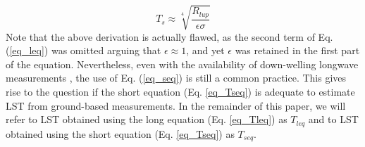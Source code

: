 \documentclass[fleqn,10pt]{wlscirep}
\begin{document}
\begin{equation}\label{eq_Tseq}
T_{s} \approx \sqrt[4]{\frac{R_{lup}}{\epsilon \sigma}}
\end{equation} 
Note that the above derivation is actually flawed, as the second term of Eq. (\ref{eq_leq}) was omitted arguing that $\epsilon\approx 1$, and yet $\epsilon$ was retained in the first part of the equation. Nevertheless, even with the availability of down-welling longwave measurements \cite{stephens1995review}, the use of Eq. (\ref{eq_seq}) is still a common practice\cite{crago_use_2014-2,mallick2018bridging}. This gives rise to the question if the short equation (Eq. \ref{eq_Tseq}) is adequate to estimate LST from ground-based measurements. In the remainder of this paper, we will refer to LST obtained using the long equation (Eq. \ref{eq_Tleq}) as $T_{leq}$ and to LST obtained using the short equation (Eq. \ref{eq_Tseq}) as $T_{seq}$.

\end{document}
